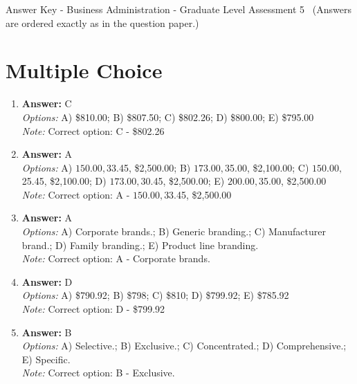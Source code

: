 \documentclass[12pt]{article}
\begin{document}
\begin{center}
Answer Key - Business Administration - Graduate Level Assessment 5 \
\small (Answers are ordered exactly as in the question paper.)
\end{center}

\section*{Multiple Choice}
\begin{enumerate}[label=\arabic*.]
\item \textbf{Answer:} C
\\ \textit{Options:} A) \$810.00; B) \$807.50; C) \$802.26; D) \$800.00; E) \$795.00
\\ \textit{Note:} Correct option: C - \$802.26
\item \textbf{Answer:} A
\\ \textit{Options:} A) $150.00, $33.45, \$2,500.00; B) $173.00, $35.00, \$2,100.00; C) $150.00, $25.45, \$2,100.00; D) $173.00, $30.45, \$2,500.00; E) $200.00, $35.00, \$2,500.00
\\ \textit{Note:} Correct option: A - $150.00, $33.45, \$2,500.00
\item \textbf{Answer:} A
\\ \textit{Options:} A) Corporate brands.; B) Generic branding.; C) Manufacturer brand.; D) Family branding.; E) Product line branding.
\\ \textit{Note:} Correct option: A - Corporate brands.
\item \textbf{Answer:} D
\\ \textit{Options:} A) \$790.92; B) \$798; C) \$810; D) \$799.92; E) \$785.92
\\ \textit{Note:} Correct option: D - \$799.92
\item \textbf{Answer:} B
\\ \textit{Options:} A) Selective.; B) Exclusive.; C) Concentrated.; D) Comprehensive.; E) Specific.
\\ \textit{Note:} Correct option: B - Exclusive.
\end{enumerate}
\end{document}
